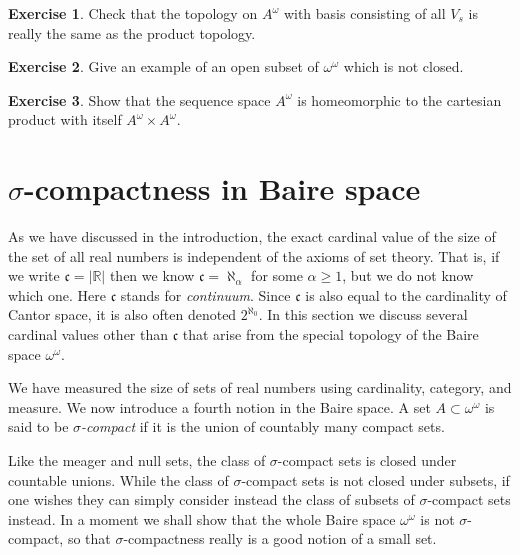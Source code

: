 \documentclass[11pt,oneside]{amsart}
\newcommand{\RR}{\mathbb R}
\theoremstyle{definition}
\newtheorem{exerc}{Exercise}[section]
\theoremstyle{definition}
\theoremstyle{remark}
\begin{document}
\begin{exerc}
  Check that the topology on $A^\omega$ with basis consisting of all $V_s$ is really the same as the product topology.
\end{exerc}

\begin{exerc}
  Give an example of an open subset of $\omega^\omega$ which is not closed.
\end{exerc}

\begin{exerc}
  Show that the sequence space $A^\omega$ is homeomorphic to the cartesian product with itself $A^\omega\times A^\omega$.
\end{exerc}


\section{$\sigma$-compactness in Baire space}

As we have discussed in the introduction, the exact cardinal value of the size of the set of all real numbers is independent of the axioms of set theory. That is, if we write $\mathfrak c=|\RR|$ then we know $\mathfrak c=\aleph_\alpha$ for some $\alpha\geq1$, but we do not know which one. Here $\mathfrak c$ stands for \emph{continuum}. Since $\mathfrak c$ is also equal to the cardinality of Cantor space, it is also often denoted $2^{\aleph_0}$. In this section we discuss several cardinal values other than $\mathfrak c$ that arise from the special topology of the Baire space $\omega^\omega$.

We have measured the size of sets of real numbers using cardinality, category, and measure. We now introduce a fourth notion in the Baire space. A set $A\subset\omega^\omega$ is said to be \emph{$\sigma$-compact} if it is the union of countably many compact sets.

Like the meager and null sets, the class of $\sigma$-compact sets is closed under countable unions. While the class of $\sigma$-compact sets is not closed under subsets, if one wishes they can simply consider instead the class of subsets of $\sigma$-compact sets instead. In a moment we shall show that the whole Baire space $\omega^\omega$ is not $\sigma$-compact, so that $\sigma$-compactness really is a good notion of a small set.
\end{document}
